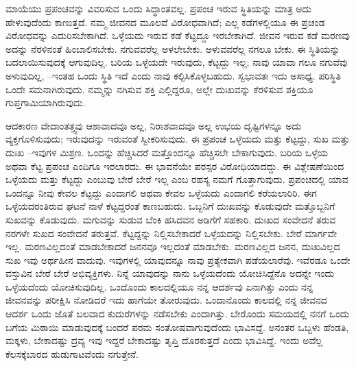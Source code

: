 ಮಾಯೆಯು ಪ್ರಪಂಚವನ್ನು ವಿವರಿಸುವ ಒಂದು ಸಿದ್ಧಾಂತವಲ್ಲ. ಪ್ರಪಂಚ ಇರುವ ಸ್ಥಿತಿಯನ್ನು ಮಾತ್ರ ಅದು ಹೇಳುವುದೆಂದು ಕಾಣುತ್ತದೆ. ನಮ್ಮ ಜೀವನದ ಮೂಲವೆ ವಿರೋಧವಾಗಿದೆ; ಎಲ್ಲ ಕಡೆಗಳಲ್ಲಿಯೂ ಈ ಪ್ರಚಂಡ ವಿರೋಧವನ್ನು ಎದುರಿಸಬೇಕಾಗಿದೆ. ಒಳ್ಳೆಯದು ಇರುವ ಕಡೆ ಕೆಟ್ಟದ್ದೂ ಇರಬೇಕಾಗಿದೆ. ಜೀವನ ಇರುವ ಕಡೆ ಮರಣವು ಅದನ್ನು ನೆರಳಿನಂತೆ ಹಿಂಬಾಲಿಸಬೇಕು. ನಗುವವರೆಲ್ಲ ಅಳಲೇಬೇಕು. ಅಳುವವರೆಲ್ಲ ನಗಲೂ ಬೇಕು. ಈ ಸ್ಥಿತಿಯನ್ನು ಬದಲಾಯಿಸುವುದಕ್ಕೆ ಆಗುವುದಿಲ್ಲ. ಬರಿಯ ಒಳ್ಳೆಯದೇ ಇರುವುದು, ಕೆಟ್ಟದ್ದು ಇಲ್ಲ; ನಾವು ಯಾವಾ ಗಲೂ ನಗುವೆವು ಅಳುವುದಿಲ್ಲ, –ಇಂತಹ ಒಂದು ಸ್ಥಿತಿ ಇದೆ ಎಂದು ನಾವು ಕಲ್ಪಿಸಿಕೊಳ್ಳಬಹುದು. ಸ್ವಭಾವತಃ ಇದು ಅಸಾಧ್ಯ. ಪರಿಸ್ಥಿತಿ ಒಂದೇ ಸಮನಾಗಿರುವುದು. ನಮ್ಮನ್ನು ನಗಿಸುವ ಶಕ್ತಿ ಎಲ್ಲಿದ್ದರೂ, ಅಲ್ಲೇ ದುಃಖವನ್ನು ಕೆರಳಿಸುವ ಶಕ್ತಿಯೂ ಗುಪ್ತಗಾಮಿಯಾಗಿರುವುದು.

ಆದಕಾರಣ ವೇದಾಂತತ್ತ್ವವು ಆಶಾವಾದವೂ ಅಲ್ಲ, ನಿರಾಶವಾದವೂ ಅಲ್ಲ ಉಭಯ ದೃಷ್ಟಿಗಳನ್ನೂ ಅದು ವ್ಯಕ್ತಗೊಳಿಸುವುದು; ಇರುವುದನ್ನು ಇರುವಂತೆ ಸ್ವೀಕರಿಸುವುದು. ಈ ಪ್ರಪಂಚ ಒಳ್ಳೆಯದು ಮತ್ತು ಕೆಟ್ಟದ್ದು, ಸುಖ ಮತ್ತು ದುಃಖ –ಇವುಗಳ ಮಿಶ್ರಣ. ಒಂದನ್ನು ಹೆಚ್ಚಿಸಿದರೆ ಮತ್ತೊಂದನ್ನೂ ಹೆಚ್ಚಿಸಲೇ ಬೇಕಾಗುವುದು. ಬರಿಯ ಒಳ್ಳೆಯ ಅಥವಾ ಕೆಟ್ಟ ಪ್ರಪಂಚ ಎಂದಿಗೂ ಇರಲಾರದು. ಈ ಭಾವನೆಯೇ ಪರಸ್ಪರ ವಿರೋಧಿಯಾದದ್ದು. ಈ ವಿಶ್ಲೇಷಣೆಯಿಂದ ಒಳ್ಳೆಯದು ಮತ್ತು ಕೆಟ್ಟದ್ದು ಎಂಬುವು ಬೇರೆ ಬೇರೆ ಇಲ್ಲ ಎಂಬ ರಹಸ್ಯ ನಮಗೆ ಗೊತ್ತಾಗುವುದು. ಪ್ರಪಂಚದಲ್ಲಿ ಯಾವ ಒಂದನ್ನೂ ನೀವು ಕೇವಲ ಕೆಟ್ಟದ್ದು ಎಂದಾಗಲಿ ಅಥವಾ ಕೇವಲ ಒಳ್ಳೆಯದು ಎಂದಾಗಲಿ ಕರೆಯಲಾರಿರಿ. ಈಗ ಒಳ್ಳೆಯದರಂತಿರುವ ಘಟನೆ ನಾಳೆ ಕೆಟ್ಟದ್ದರಂತೆ ಕಾಣಬಹುದು. ಒಬ್ಬನಿಗೆ ದುಃಖವನ್ನು ಕೊಡುವುದೇ ಮತ್ತೊಬ್ಬನಿಗೆ ಸುಖವನ್ನು ಕೊಡುವುದು. ಮಗುವನ್ನು ಸುಡುವ ಬೆಂಕಿ ಹಸಿದವನ ಅಡಿಗೆಗೆ ಸಹಕಾರಿ. ದುಃಖದ ಸಂವೇದನೆ ತರುವ ನರಗಳೇ ಸುಖದ ಸಂವೇದನೆ ತರುತ್ತವೆ. ಕೆಟ್ಟದ್ದನ್ನು ನಿಲ್ಲಿಸಬೇಕಾದರೆ ಒಳ್ಳೆಯದನ್ನು ನಿಲ್ಲಿಸಬೇಕು. ಬೇರೆ ಮಾರ್ಗವೇ ಇಲ್ಲ. ಮರಣವಿಲ್ಲದಂತೆ ಮಾಡಬೇಕಾದರೆ ಜನನವೂ ಇಲ್ಲದಂತೆ ಮಾಡಬೇಕು. ಮರಣವಿಲ್ಲದ ಜನನ, ದುಃಖವಿಲ್ಲದ ಸುಖ ಇವು ಅರ್ಥಹೀನ ವಾದುವು. ಇವುಗಳಲ್ಲಿ ಯಾವುದನ್ನೂ ನಾವು ಪ್ರತ್ಯೇಕವಾಗಿ ಪಡೆಯಲಾರೆವು. ಇವೆರಡೂ ಒಂದೇ ವಸ್ತುವಿನ ಬೇರೆ ಬೇರೆ ಅಭಿವ್ಯಕ್ತಿಗಳು. ನಿನ್ನೆ ಯಾವುದನ್ನು ನಾನು ಒಳ್ಳೆಯದೆಂದು ಯೋಚಿಸಿದ್ದೆನೊ ಅದನ್ನೇ ಇಂದು ಒಳ್ಳೆಯದೆಂದು ಯೋಚಿಸುವುದಿಲ್ಲ. ಒಂದೊಂದು ಕಾಲದಲ್ಲಿಯೂ ನನ್ನ ಆದರ್ಶವು ಏನಾಗಿತ್ತು ಎಂದು ನನ್ನ ಜೀವನವನ್ನು ಪರೀಕ್ಷಿಸಿ ನೋಡಿದರೆ ಇದು ಹಾಗೆಯೇ ತೋರುವುದು. ಒಂದಾನೊಂದು ಕಾಲದಲ್ಲಿ ನನ್ನ ಜೀವನದ ಆದರ್ಶ ಒಂದು ಜೊತೆ ಬಲವಾದ ಕುದುರೆಗಳನ್ನು ನಡೆಸಬೇಕು ಎಂದಾಗಿತ್ತು. ಬೇರೊಂದು ಸಮಯದಲ್ಲಿ ನನಗೆ ಒಂದು ಬಗೆಯ ಮಿಠಾಯಿ ಮಾಡುವುದಕ್ಕೆ ಬಂದರೆ ಪರಮ ಸಂತೋಷವಾಗುವುದೆಂದು ಭಾವಿಸದ್ದೆ. ಅನಂತರ ಒಬ್ಬಳು ಹೆಂಡತಿ, ಮಕ್ಕಳು, ಬೇಕಾದಷ್ಟು ದ್ರವ್ಯ ಇವು ಇದ್ದರೆ ಬೇಕಾದಷ್ಟು ತೃಪ್ತಿ ದೊರಕುತ್ತದೆ ಎಂದು ಭಾವಿಸಿದ್ದೆ. ಇಂದು ಅವೆಲ್ಲ ಕೆಲಸಕ್ಕೆಬಾರದ ಹುಡುಗಾಟವೆಂದು ನಗುತ್ತೇನೆ.

